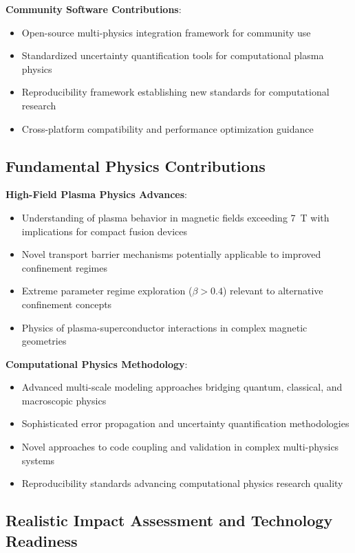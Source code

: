 \documentclass[12pt,a4paper]{article}
\begin{document}
\textbf{Community Software Contributions}:
\begin{itemize}
\item Open-source multi-physics integration framework for community use
\item Standardized uncertainty quantification tools for computational plasma physics
\item Reproducibility framework establishing new standards for computational research
\item Cross-platform compatibility and performance optimization guidance
\end{itemize}

\subsection{Fundamental Physics Contributions}

\textbf{High-Field Plasma Physics Advances}:
\begin{itemize}
\item Understanding of plasma behavior in magnetic fields exceeding 7~T with implications for compact fusion devices
\item Novel transport barrier mechanisms potentially applicable to improved confinement regimes
\item Extreme parameter regime exploration ($\beta > 0.4$) relevant to alternative confinement concepts
\item Physics of plasma-superconductor interactions in complex magnetic geometries
\end{itemize}

\textbf{Computational Physics Methodology}:
\begin{itemize}
\item Advanced multi-scale modeling approaches bridging quantum, classical, and macroscopic physics
\item Sophisticated error propagation and uncertainty quantification methodologies
\item Novel approaches to code coupling and validation in complex multi-physics systems
\item Reproducibility standards advancing computational physics research quality
\end{itemize}

\subsection{Realistic Impact Assessment and Technology Readiness}
\end{document}

